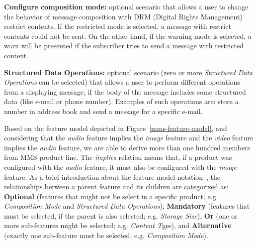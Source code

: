 \documentclass{acm_proc_article-sp}
\begin{document}

{\bf Configure composition mode:} optional scenario that allows a user to change the behavior of message composition with DRM (Digital Rights Management) restrict contents. If the restricted mode is selected, a message with restrict contents could not be sent. On the other hand, if the warning mode is selected, a warn will be presented if the subscriber tries to send a message with restricted content. %

{\bf Structured Data Operations:} optional scenario (zero or more \emph{Structured Data Operations} can be selected) that allows a user to perform different operations from a displaying message, if the body of the message includes some structured data (like e-mail or phone number). Examples of such operations are: store a number in address book and send a message for a specific e-mail.

Based on the feature model depicted in Figure~\ref{mms-feature-model}, and considering that the \emph{audio} feature implies the \emph{image} feature and the \emph{video} feature implies the \emph{audio} feature, we are able to derive more than one hundred members from MMS product line. The \emph{implies} relation means that, if a product was configured with the \emph{audio} feature, it must also be configured with the \emph{image} feature. As a brief introduction about the feature model notation~\cite{czarnecki-book,gheyi-alloy-06}, the relationships between a parent feature and its children are categorized as: {\bf Optional} (features that might not be select in a specific product; e.g. \emph{Composition Mode} and \emph{Structured Data Operations}), {\bf Mandatory} (features that must be selected, if the parent is also selected; e.g. \emph{Storage Size}), {\bf Or} (one or more sub-features might be selected; e.g. \emph{Content Type}), and {\bf Alternative} (exactly one sub-feature must be selected; e.g. \emph{Composition Mode}).

\begin{figure*}
\centering
{}
\caption{MMS feature model}
\label{mms-feature-model}
\end{figure*}
\end{document}
